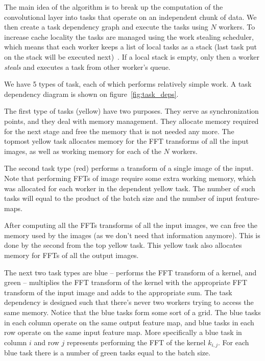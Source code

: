 \documentclass[conference]{IEEEtran}
\begin{document}
The main idea of the algorithm is to break up the computation of the
convolutional layer into tasks that operate on an independent chunk of
data.  We then create a task dependency graph and execute the tasks
using $N$ workers.  To increase cache locality the tasks are managed
using the work stealing scheduler, which means that each worker keeps
a list of local tasks as a stack (last task put on the stack will be
executed next)~\cite{reinders2007intel}.  If a local stack is empty,
only then a worker \emph{steals} and executes a task from other
worker's queue.

We have 5 types of task, each of which performs relatively simple
work.  A task dependency diagram is shown on
figure~\ref{fig:task_deps}.

The first type of tasks (yellow) have two purposes.  They serve as
synchronization points, and they deal with memory management.  They
allocate memory required for the next stage and free the memory that
is not needed any more.  The topmost yellow task allocates memory for
the FFT transforms of all the input images, as well as working memory
for each of the $N$ workers.

The second task type (red) performs a transform of a single image of
the input.  Note that performing FFTs of image require some extra
working memory, which was allocated for each worker in the dependent
yellow task.  The number of such tasks will equal to the product of
the batch size and the number of input feature-maps.

After computing all the FFTs transforms of all the input images, we
can free the memory used by the images (as we don't need that
information anymore).  This is done by the second from the top yellow
task.  This yellow task also allocates memory for FFTs of all the
output images.

The next two task types are blue -- performs the FFT transform of a
kernel, and green -- multiplies the FFT transform of the kernel with
the appropriate FFT transform of the input image and adds to the
appropriate sum.  The task dependency is designed such that there's
never two workers trying to access the same memory.  Notice that the
blue tasks form some sort of a grid.  The blue tasks in each column
operate on the same output feature map, and blue tasks in each row
operate on the same input feature map.  More specifically a blue task
in column $i$ and row $j$ represents performing the FFT of the kernel
$k_{i,j}$.  For each blue task there is a number of green tasks equal
to the batch size.
\end{document}
